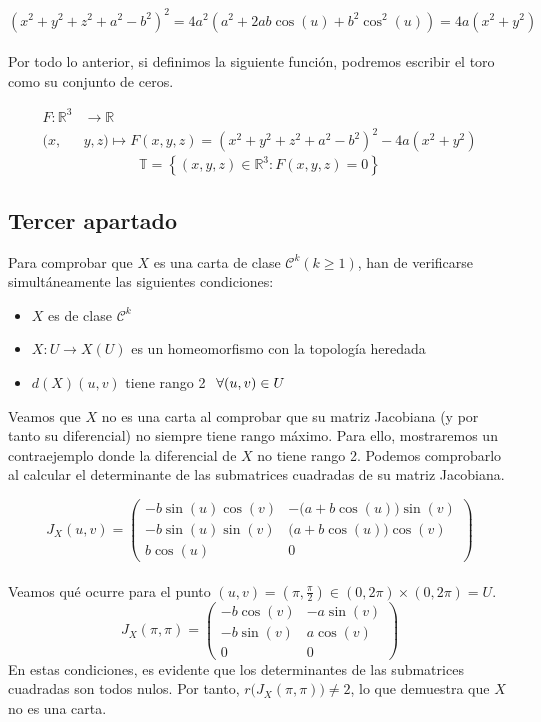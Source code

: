 \documentclass{article}
\begin{document}
$$ (x^2+y^2+z^2+a^2-b^2)^2 = 4a^2(a^2 + 2ab \cos(u) + b^2\cos^2(u)) = 4a(x^2 + y^2)$$
\\ \noindent
Por todo lo anterior, si definimos la siguiente función, podremos escribir el toro como su conjunto de ceros.

$$
    \begin{aligned}
        F: \mathbb{R}^3& \longrightarrow \mathbb{R} \\
        (x,& y, z)  \longmapsto  F(x, y, z)= (x^2+y^2+z^2+a^2-b^2)^2 - 4a(x^2 + y^2)
    \end{aligned}
$$
$$\mathbb{T} = \left\{(x,y,z) \in \mathbb{R}^3 :F(x,y,z) = 0\right\}$$
    

\newpage

\subsection{Tercer apartado}
\hspace{1mm} Para comprobar que $X$ es una carta de clase $\mathcal{C}^k (k\geq1)$,
han de verificarse simultáneamente las siguientes condiciones:
\begin{itemize}
    \item $X$ es de clase $\mathcal{C}^k$
    \item $X : U \longrightarrow X(U)$ es un homeomorfismo con la topología heredada
    \item $d(X)(u,v) $ tiene rango 2 $ \hspace{1.5mm} \forall (u,v) \in U$
\end{itemize}

\vspace{2mm}
Veamos que $X$ no es una carta al comprobar que su matriz Jacobiana (y por tanto su diferencial) no siempre
tiene rango máximo. Para ello, mostraremos un contraejemplo donde la diferencial
de $X$ no tiene rango 2. Podemos comprobarlo al calcular el determinante de las
submatrices cuadradas de su matriz Jacobiana.

\[
J_X(u,v) =
\begin{pmatrix}
-b \sin(u) \cos(v) & -\big(a + b\cos(u) \big) \sin(v)\\[2ex]
-b \sin(u) \sin(v) & \big(a + b \cos(u) \big) \cos(v)\\[2ex]
b \cos(u) & 0
\end{pmatrix}
\]
\\[2ex]
\noindent Veamos qué ocurre para el punto $(u,v) = (\pi, \frac{\pi}{2}) \in (0, 2\pi) \times (0, 2\pi) = U$.
\[
J_X(\pi,\pi) =
\begin{pmatrix}
-b \cos(v) & -a\sin(v)\\[2ex]
-b\sin(v) & a \cos(v) \\[2ex]
0 & 0
\end{pmatrix}
\]
En estas condiciones, es evidente que los determinantes de las submatrices cuadradas
son todos nulos. Por tanto, $r\big(J_X(\pi, \pi)\big) \neq 2$, lo que demuestra que $X$
no es una carta. 
\end{document}
